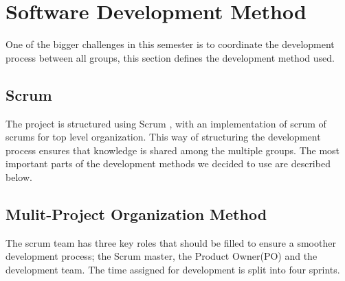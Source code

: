 \section{Software Development Method}
One of the bigger challenges in this semester is to coordinate the development process between all groups, this section defines the development method used. 


\subsection{Scrum}\label{ssec:Scrum}

The project is structured using Scrum , with an implementation of scrum of scrums for top level organization. This way of structuring the development process ensures that knowledge is shared among the multiple groups. The most important parts of the development methods we decided to use are described below. 


\subsection{Mulit-Project Organization Method}
The scrum team has three key roles that should be filled to ensure a smoother development process; the Scrum master, the Product Owner(PO) and the development team. The time assigned for development is split into four sprints.



